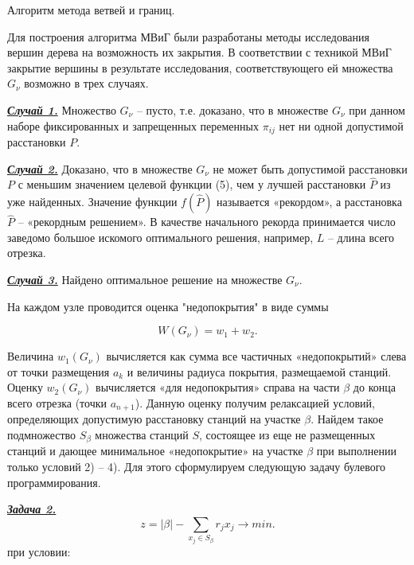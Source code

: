 Алгоритм метода ветвей и границ.

Для построения алгоритма МВиГ были разработаны методы исследования вершин дерева на возможность их закрытия.
В соответствии с техникой МВиГ закрытие вершины в результате исследования, соответствующего ей множества $G_\nu$ возможно в трех случаях.

\underline{\textit{\textbf{Случай 1.}}} Множество $G_\nu$ -- пусто, т.е. доказано, что в множестве $G_\nu$ при данном наборе фиксированных и запрещенных переменных $\pi_{ij}$ нет ни одной допустимой расстановки $P$.

\underline{\textit{\textbf{Случай 2.}}} Доказано, что в множестве $G_\nu$ не может быть допустимой расстановки $P$ с меньшим значением целевой функции (5), чем у лучшей расстановки $\widehat{P}$ из уже найденных. Значение функции $f(\widehat{P})$ называется «рекордом», а расстановка $\widehat{P}$ -- «рекордным решением». В качестве начального рекорда принимается число заведомо большое искомого оптимального решения, например, $L$ – длина всего отрезка.

\underline{\textit{\textbf{Случай 3.}}} Найдено оптимальное решение на множестве $G_\nu$.

На каждом узле проводится оценка "недопокрытия"  в виде суммы

\begin{displaymath}
    W\left(G_\nu\right) = w_1 + w_2. 
\end{displaymath}

Величина $w_1 \left(G_\nu \right)$ вычисляется как сумма все частичных «недопокрытий» слева от точки размещения $a_k$ и величины радиуса покрытия, размещаемой станций. Оценку $w_2 \left(G_\nu \right)$ вычисляется «для недопокрытия» справа на части $\beta$ до конца всего отрезка (точки $a_{n+1}$). Данную оценку получим релаксацией условий, определяющих допустимую расстановку станций на участке $\beta$. Найдем такое подмножество $S_\beta$ множества станций $S$, состоящее из еще не размещенных станций и дающее минимальное «недопокрытие» на участке $\beta$ при выполнении только условий 2) – 4). Для этого сформулируем следующую задачу булевого программирования.

\underline{\textit{\textbf{Задача 2.}}}
\begin{displaymath}
    z = |\beta| - \sum\limits_{x_j \in S_\beta} r_j x_j \rightarrow min.
\end{displaymath}
при условии:

